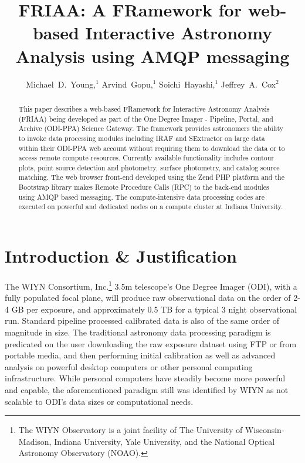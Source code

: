 
\resetcounters


\title{FRIAA: A FRamework for web-based Interactive Astronomy Analysis using AMQP messaging}
\author{Michael~D.~Young,$^1$ Arvind~Gopu,$^1$ Soichi~Hayashi,$^1$ Jeffrey~A.~Cox$^2$
}


\begin{abstract}

This paper describes a web-based FRamework for Interactive Astronomy Analysis (FRIAA) being developed as part of the One Degree Imager - Pipeline, Portal, and Archive (ODI-PPA) Science Gateway. The framework provides astronomers the ability to invoke data processing modules including IRAF and SExtractor on large data within their ODI-PPA web account without requiring them to download the data or to access remote compute resources. Currently available functionality includes contour plots, point source detection and photometry, surface photometry, and catalog source matching. The web browser front-end developed using the Zend PHP platform and the Bootstrap library makes Remote Procedure Calls (RPC) to the back-end modules using AMQP based messaging. The compute-intensive data processing codes are executed on powerful and dedicated nodes on a compute cluster at Indiana University. 

\end{abstract}

\section{Introduction \& Justification}
\label{section:intro}

The WIYN Consortium, Inc.\footnote{The WIYN Observatory is a joint facility of The University of Wisconsin-Madison, Indiana University, Yale University, and the National Optical Astronomy Observatory (NOAO).} 3.5m telescope's One Degree Imager (ODI), with a fully populated focal plane, will produce raw observational data on the order of 2-4 GB per exposure, and approximately 0.5 TB for a typical 3 night observational run. Standard pipeline processed calibrated data is also of the same order of magnitude in size. The traditional astronomy data processing paradigm is predicated on the user downloading the raw exposure dataset using FTP or from portable media, and then performing initial calibration as well as advanced analysis on powerful desktop computers or other personal computing infrastructure. While personal computers have steadily become more powerful and capable, the aforementioned paradigm still was identified by WIYN as not scalable to ODI's data sizes or computational needs. 

